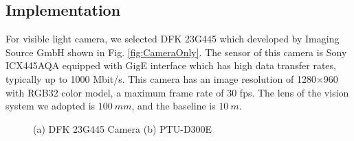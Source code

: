\subsection{Implementation}


%



For visible light camera, we selected DFK 23G445 which developed by Imaging Source GmbH shown in Fig. \ref{fig:CameraOnly}. The sensor of this camera is Sony ICX445AQA equipped with GigE interface which has high data transfer rates, typically up to 1000 Mbit/s. This camera has an image resolution of 1280$\times$960 with RGB32 color model, a maximum frame rate of 30 fps. The lens of the vision system we adopted is $100\ mm$, and the baseline is $10\ m$. 


\begin{figure}[!tb]
	\centering
	\caption{(a) DFK 23G445 Camera (b) PTU-D300E}
\end{figure}

